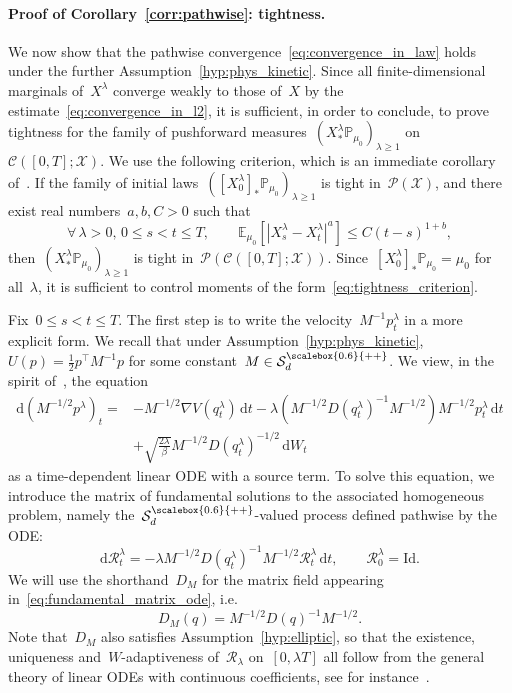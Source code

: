 \documentclass[10pt]{article}
\newcommand{\cR}{\mathcal{R}}
\renewcommand{\d}{\mathrm{d}}
\newcommand{\E}{\mathbb{E}}
\renewcommand{\P}{\mathbb{P}}
\newcommand{\cX}{\mathcal{X}}
\newcommand{\cC}{\mathcal{C}}
\newcommand{\cP}{\mathcal{P}}
\newcommand{\cSpd}{\mathcal{S}_d^{\scalebox{0.6}{++}}}
\newcommand{\1}{\mathbbm 1}
\newcommand{\Id}{\mathrm{Id}}
\begin{document}
\paragraph{Proof of Corollary~\ref{corr:pathwise}: tightness.}
We now show that the pathwise convergence~\eqref{eq:convergence_in_law} holds under the further Assumption~\ref{hyp:phys_kinetic}.
Since all finite-dimensional marginals of~$X^\lambda$ converge weakly to those of~$X$ by the estimate~\eqref{eq:convergence_in_l2}, it is sufficient, in order to conclude, to prove tightness for the family of pushforward measures~$(X^\lambda_* \P_{\mu_0})_{\lambda\geq 1}$ on~$\mathcal C([0,T];\cX)$.
We use the following criterion, which is an immediate corollary of~\cite[Theorem 12.3]{B68}. If the family of initial laws~$\left(\left[X_0^\lambda\right]_*\P_{\mu_0}\right)_{\lambda\geq 1}$ is tight in~$\cP(\cX)$, and there exist real numbers~$a,b,C>0$ such that
\begin{equation}
    \label{eq:tightness_criterion}
    \forall\,\lambda>0,\,0\leq s<t\leq T,\qquad \E_{\mu_0}\left[\left|X_s^\lambda-X_t^\lambda\right|^a\right]\leq C(t-s)^{1+b},
\end{equation}
then~$(X^\lambda_*\P_{\mu_0})_{\lambda\geq 1}$ is tight in~$\cP(\cC([0,T];\cX))$. Since~$\left[X_0^\lambda\right]_*\P_{\mu_0}=\mu_0$ for all~$\lambda$, it is sufficient to control moments of the form~\eqref{eq:tightness_criterion}.

Fix~$0\leq s< t \leq T$. The first step is to write the velocity~$M^{-1}p_t^\lambda$ in a more explicit form. We recall that under Assumption~\ref{hyp:phys_kinetic},~$U(p)=\frac12 p^\top M^{-1}p$ for some constant~$M\in\cSpd$. We view, in the spirit of~\cite{BHVW17,WSW24}, the equation
\begin{equation}
    \begin{aligned}
        \d(M^{-1/2}p^\lambda)_t = &-M^{-1/2}\nabla V(q_t^\lambda)\,\d t - \lambda\left(M^{-1/2}D(q_t^\lambda)^{-1}M^{-1/2}\right)M^{-1/2}p_t^\lambda\,\d t \\
        &+ \sqrt{\frac{2\lambda}{\beta}}M^{-1/2}D(q_t^\lambda)^{-1/2}\,\d W_t 
    \end{aligned}
\end{equation}
as a time-dependent linear ODE with a source term.
To solve this equation, we introduce the matrix of fundamental solutions to the associated homogeneous problem, namely the~$\cSpd$-valued process defined pathwise by the ODE:
\begin{equation}
    \label{eq:fundamental_matrix_ode}
    \d\cR^\lambda_t = -\lambda M^{-1/2} D(q_t^\lambda)^{-1}M^{-1/2}\cR^\lambda_t\,\d t,\qquad \cR^\lambda_0 = \Id.
\end{equation}
We will use the shorthand~$D_M$ for the matrix field appearing in~\eqref{eq:fundamental_matrix_ode}, i.e.
\begin{equation}
D_M(q) = M^{-1/2}D(q)^{-1}M^{-1/2}.
\end{equation}
Note that~$D_M$ also satisfies Assumption~\eqref{hyp:elliptic}, so that the existence, uniqueness and~$W$-adaptiveness of~$\cR_\lambda$ on~$[0,\lambda T]$ all follow from the general theory of linear ODEs with continuous coefficients, see for instance~\cite[Section 3.4]{T00}.
\end{document}
